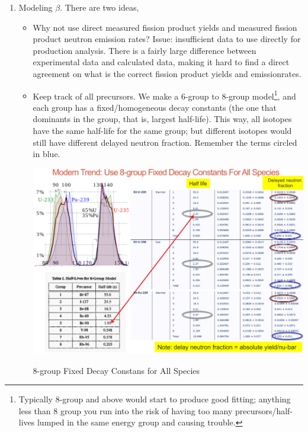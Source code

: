 \documentclass{school-22.211-notes}
\begin{document}
\begin{enumerate}
\item Modeling $\beta$. There are two ideas,  
  \begin{itemize}
  \item Why not use direct measured fission product yields and measured fission product neutron emission rates? Issue: insufficient data to use directly for production analysis. There is a fairly large difference between experimental data and calculated data, making it hard to find a direct agreement on what is the correct fission product yields and emissionrates. 
  \item Keep track of all precursors. We make a 6-group to 8-group model\footnote{Typically 8-group and above would start to produce good fitting; anything less than 8 group you run into the risk of having too many precursors/half-lives lumped in the same energy group and causing trouble.}, and each group has a fixed/homogeneous decay constants (the one that dominants in the group, that is, largest half-life). This way, all isotopes have the same half-life for the same group; but different isotopes would still have different delayed neutron fraction. Remember the terms circled in blue.  
    \begin{table}[ht]
      \centering
      \includegraphics[width=5in]{images/pke/8-group-fixed-decay-constants.png}
      \caption{8-group Fixed Decay Constans for All Species}
    \end{table}
  \end{itemize}



\end{enumerate}
\end{document}
